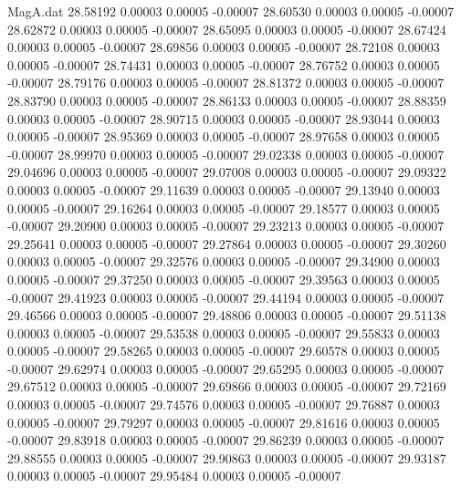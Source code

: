 \begin{filecontents}{MagA.dat}
  28.58192    0.00003    0.00005   -0.00007
  28.60530    0.00003    0.00005   -0.00007
  28.62872    0.00003    0.00005   -0.00007
  28.65095    0.00003    0.00005   -0.00007
  28.67424    0.00003    0.00005   -0.00007
  28.69856    0.00003    0.00005   -0.00007
  28.72108    0.00003    0.00005   -0.00007
  28.74431    0.00003    0.00005   -0.00007
  28.76752    0.00003    0.00005   -0.00007
  28.79176    0.00003    0.00005   -0.00007
  28.81372    0.00003    0.00005   -0.00007
  28.83790    0.00003    0.00005   -0.00007
  28.86133    0.00003    0.00005   -0.00007
  28.88359    0.00003    0.00005   -0.00007
  28.90715    0.00003    0.00005   -0.00007
  28.93044    0.00003    0.00005   -0.00007
  28.95369    0.00003    0.00005   -0.00007
  28.97658    0.00003    0.00005   -0.00007
  28.99970    0.00003    0.00005   -0.00007
  29.02338    0.00003    0.00005   -0.00007
  29.04696    0.00003    0.00005   -0.00007
  29.07008    0.00003    0.00005   -0.00007
  29.09322    0.00003    0.00005   -0.00007
  29.11639    0.00003    0.00005   -0.00007
  29.13940    0.00003    0.00005   -0.00007
  29.16264    0.00003    0.00005   -0.00007
  29.18577    0.00003    0.00005   -0.00007
  29.20900    0.00003    0.00005   -0.00007
  29.23213    0.00003    0.00005   -0.00007
  29.25641    0.00003    0.00005   -0.00007
  29.27864    0.00003    0.00005   -0.00007
  29.30260    0.00003    0.00005   -0.00007
  29.32576    0.00003    0.00005   -0.00007
  29.34900    0.00003    0.00005   -0.00007
  29.37250    0.00003    0.00005   -0.00007
  29.39563    0.00003    0.00005   -0.00007
  29.41923    0.00003    0.00005   -0.00007
  29.44194    0.00003    0.00005   -0.00007
  29.46566    0.00003    0.00005   -0.00007
  29.48806    0.00003    0.00005   -0.00007
  29.51138    0.00003    0.00005   -0.00007
  29.53538    0.00003    0.00005   -0.00007
  29.55833    0.00003    0.00005   -0.00007
  29.58265    0.00003    0.00005   -0.00007
  29.60578    0.00003    0.00005   -0.00007
  29.62974    0.00003    0.00005   -0.00007
  29.65295    0.00003    0.00005   -0.00007
  29.67512    0.00003    0.00005   -0.00007
  29.69866    0.00003    0.00005   -0.00007
  29.72169    0.00003    0.00005   -0.00007
  29.74576    0.00003    0.00005   -0.00007
  29.76887    0.00003    0.00005   -0.00007
  29.79297    0.00003    0.00005   -0.00007
  29.81616    0.00003    0.00005   -0.00007
  29.83918    0.00003    0.00005   -0.00007
  29.86239    0.00003    0.00005   -0.00007
  29.88555    0.00003    0.00005   -0.00007
  29.90863    0.00003    0.00005   -0.00007
  29.93187    0.00003    0.00005   -0.00007
  29.95484    0.00003    0.00005   -0.00007

\end{filecontents}
